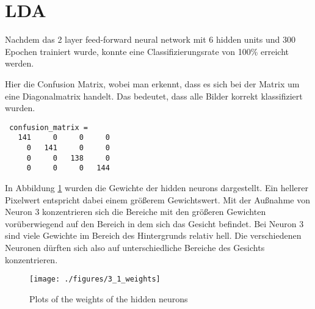 \section{LDA}

Nachdem das 2 layer feed-forward neural network mit 6 hidden units und 300 Epochen trainiert wurde, konnte
eine Classifizierungsrate von 100\% erreicht werden.

Hier die Confusion Matrix, wobei man erkennt, dass es sich bei der Matrix um eine Diagonalmatrix handelt. Das
bedeutet, dass alle Bilder korrekt klassifiziert wurden.
\begin{verbatim}
 confusion_matrix =
   141     0     0     0
     0   141     0     0
     0     0   138     0
     0     0     0   144
\end{verbatim}

In Abbildung \ref{fig:pose_weights} wurden die Gewichte der hidden neurons dargestellt. Ein hellerer Pixelwert
entspricht dabei einem größerem Gewichtswert.
Mit der Außnahme von Neuron 3 konzentrieren sich die Bereiche mit den größeren Gewichten vorüberwiegend
auf den Bereich in dem sich das Gesicht befindet. Bei Neuron 3 sind viele Gewichte im Bereich des Hintergrunds
relativ hell. Die verschiedenen Neuronen dürften sich also auf unterschiedliche Bereiche des Gesichts konzentrieren.
\begin{figure}[hp!]
\begin{center}
 \texttt{[image: ./figures/3\_1\_weights]}
 \caption{Plots of the weights of the hidden neurons}
\label{fig:pose_weights}
\end{center}
\end{figure}




